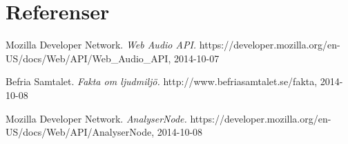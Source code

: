 \documentclass[12pt, titlepage, a4paper]{article}
\begin{document}
	\pagebreak
	
	\section{Referenser}
	\renewcommand{\addcontentsline}[3]{}%
  \renewcommand{\section}[2]{}%
  \begin{thebibliography}{99}

    Mozilla Developer Network.
    \emph{Web Audio API.}
    https://developer.mozilla.org/en-US/docs/Web/API/Web\_Audio\_API, 2014-10-07

    Befria Samtalet.
    \emph{Fakta om ljudmiljö.}
    http://www.befriasamtalet.se/fakta, 2014-10-08

    Mozilla Developer Network.
    \emph{AnalyserNode.}
    https://developer.mozilla.org/en-US/docs/Web/API/AnalyserNode, 2014-10-08
  \end{thebibliography}
\end{document}
